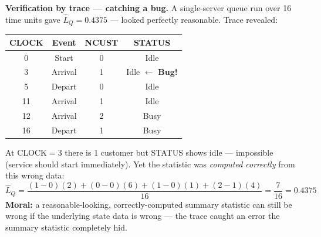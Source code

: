 \begin{examplebox}
\textbf{Verification by trace — catching a bug.} A single-server queue run over 16 time units gave $\hat L_Q=0.4375$ — looked perfectly reasonable. Trace revealed:
\begin{center}\small
\begin{tabular}{@{}cccc@{}}
\toprule
CLOCK & Event & NCUST & STATUS\\
\midrule
0 & Start & 0 & Idle\\
3 & Arrival & 1 & Idle $\leftarrow$ \textbf{Bug!}\\
5 & Depart & 0 & Idle\\
11 & Arrival & 1 & Idle\\
12 & Arrival & 2 & Busy\\
16 & Depart & 1 & Busy\\
\bottomrule
\end{tabular}
\end{center}
At CLOCK$=3$ there is 1 customer but STATUS shows idle — impossible (service should start immediately). Yet the statistic was \emph{computed correctly} from this wrong data:
\[
\hat L_Q = \frac{(1{-}0)(2)+(0{-}0)(6)+(1{-}0)(1)+(2{-}1)(4)}{16} = \frac{7}{16}=0.4375
\]
\textbf{Moral:} a reasonable-looking, correctly-computed summary statistic can still be wrong if the underlying state data is wrong — the trace caught an error the summary statistic completely hid.
\end{examplebox}

